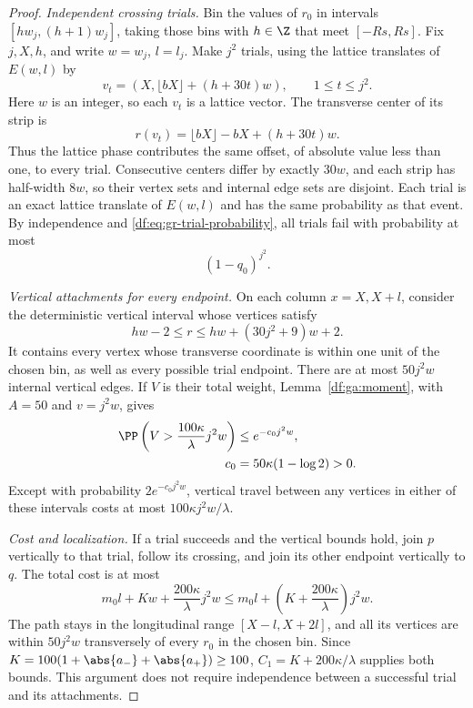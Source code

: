 \begin{proof}
\emph{Independent crossing trials.}
Bin the values of $r_0$ in intervals $[hw_j,(h+1)w_j]$, taking those
bins with $h\in\Z$ that meet $[-Rs,Rs]$.
Fix $j,X,h$, and write $w=w_j$, $l=l_j$. Make $j^2$ trials, using the
lattice translates of $E(w,l)$ by
\[
 v_t=(X,\lfloor bX\rfloor+(h+30t)w),\qquad1\le t\le j^2.
\]
Here $w$ is an integer, so each $v_t$ is a lattice vector. The
transverse center of its strip is
\[
 r(v_t)=\lfloor bX\rfloor-bX+(h+30t)w.
\]
Thus the lattice phase contributes the same offset, of absolute value
less than one, to every trial. Consecutive centers differ by exactly
$30w$, and each strip has half-width $8w$, so their vertex sets and
internal edge sets are disjoint. Each trial is an exact lattice
translate of $E(w,l)$ and has the same probability as that event.
By independence and \eqref{df:eq:gr-trial-probability}, all trials fail
with probability at most
\begin{equation}\label{df:eq:gr-trial-failure}
 (1-q_0)^{j^2}.
\end{equation}

\emph{Vertical attachments for every endpoint.}
On each column $x=X,X+l$, consider the deterministic vertical
interval whose vertices satisfy
\[
 hw-2\le r\le hw+(30j^2+9)w+2.
\]
It contains every vertex whose transverse coordinate is within one
unit of the chosen bin, as well as every possible trial endpoint. There
are at most $50j^2w$ internal vertical edges. If $V$ is their total
weight, Lemma~\ref{df:ga:moment}, with $A=50$ and $v=j^2w$, gives
\[
 \begin{split}
 \PP\left(V>\frac{100\kappa}{\lambda}j^2w\right)
 &\le e^{-c_0j^2w},\\
 c_0&=50\kappa(1-\log2)>0.
 \end{split}
\]
Except with probability $2e^{-c_0j^2w}$, vertical travel between any
vertices in either of these intervals costs at most
$100\kappa j^2w/\lambda$.

\emph{Cost and localization.}
If a trial succeeds and the vertical bounds hold, join $p$ vertically
to that trial, follow its crossing, and join its other endpoint
vertically to $q$. The total cost is at most
\[
 m_0l+Kw+\frac{200\kappa}{\lambda}j^2w
 \le m_0l+\left(K+\frac{200\kappa}{\lambda}\right)j^2w.
\]
The path stays in the longitudinal range $[X-l,X+2l]$, and all its vertices
are within $50j^2w$ transversely of every $r_0$ in the chosen bin.
Since $K=100(1+\abs{a_-}+\abs{a_+})\ge100$,
$C_1=K+200\kappa/\lambda$ supplies both bounds. This argument does not
require independence between a successful trial and its attachments.


\end{proof}
